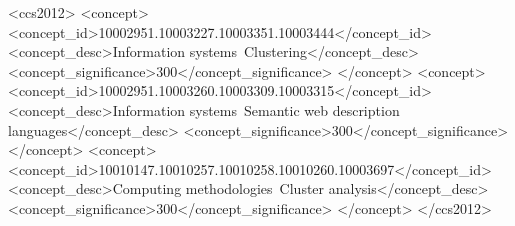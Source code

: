 \documentclass[sigconf]{acmart}
\begin{document}
%
%
\begin{CCSXML}
	<ccs2012>
	<concept>
	<concept_id>10002951.10003227.10003351.10003444</concept_id>
	<concept_desc>Information systems~Clustering</concept_desc>
	<concept_significance>300</concept_significance>
	</concept>
	<concept>
	<concept_id>10002951.10003260.10003309.10003315</concept_id>
	<concept_desc>Information systems~Semantic web description languages</concept_desc>
	<concept_significance>300</concept_significance>
	</concept>
	<concept>
	<concept_id>10010147.10010257.10010258.10010260.10003697</concept_id>
	<concept_desc>Computing methodologies~Cluster analysis</concept_desc>
	<concept_significance>300</concept_significance>
	</concept>
	</ccs2012>
\end{CCSXML}








\maketitle





 
\end{document}
